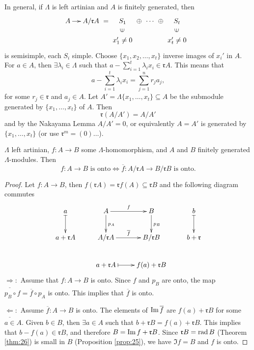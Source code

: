 In general, if $\Lambda$ is left artinian and $A$ is finitely
generated, then 
\[\xymatrix@C-2pc@R-1pc{
A\ar[rrr] &&& A/\mathfrak{r}A &=& S_1 & \oplus &\cdots& \oplus & S_t\\
        &&&                 & & x_1' \neq 0 \ar@{}[u]|-*[@]{\in} &&&& x_t' \neq 0 \ar@{}[u]|-*[@]{\in} &
      }\]
is semisimple, each $S_i$ simple.
Choose $\{ x_1, x_2, \ldots, x_t \}$ inverse images of $x_i'$ in $A$.
For $a \in A$, then $\exists \lambda_i \in \Lambda$ such that $a -
\sum_{i=1}^t \lambda_i x_i \in \mathfrak{r}A$. This means that 
$$a - \sum_{i=1}^t \lambda_i x_i = \sum_{j=1}^n r_ja_j, $$
for some $r_j \in \mathfrak{r}$ and $a_j \in A$. 
Let $A' = \Lambda\{ x_1, \ldots , x_t \} \subseteq A$ be the submodule
generated by $\{ x_1, \ldots , x_t \}$ of $A$. Then 
$$\mathfrak{r}(A/A') = A/A'$$
and by the Nakayama Lemma $A/A' = 0$, or equivalently $A = A'$ is
generated by $\{ x_1, \ldots , x_t \}$ (or use $\mathfrak{r}^m = (0)
\ldots$). 

\begin{lem}\label{lem:f_onto_iff_f-bar_onto}
$\Lambda$ left artinian, $f\colon A \to B$ some $\Lambda$-homomorphism, and
$A$ and $B$ finitely generated $\Lambda$-modules. Then
$$ f\colon A \to B \text{ is onto} \iff \overline{f}\colon A/\mathfrak{r}A \to B/\mathfrak{r}B \text{ is onto.} $$
\end{lem}
\begin{proof}
Let $f\colon A \to B$, then $f(\mathfrak{r}A) = \mathfrak{r}f(A) \subseteq
\mathfrak{r}B$ and the following diagram commutes
$$\xymatrix{
a\ar@{|->}[d] & A\ar[r]^f\ar[d]^{p_A} & B\ar[d]^{p_B} & b\ar@{|->}[d]\\
a + \mathfrak{r}A & A/\mathfrak{r}A\ar[r]^{\overline{f}} & B/\mathfrak{r}B & b + \mathfrak{r}\\
& a + \mathfrak{r}A\ar@{|->}[r] & f(a) + \mathfrak{r}B
}
$$
$\underline{\Rightarrow} :$ Assume that $f\colon A \to B$ is onto. Since
$f$ and $p_B$ are onto, the map $p_B \circ f = \overline{f} \circ p_A$
is onto. This implies that $\overline{f}$ is onto.

$\underline{\Leftarrow} :$ Assume $\overline{f}\colon A \to B$ is onto. The
elements of $\operatorname{Im}\nolimits \overline{f}$ are $f(a) + \mathfrak{r}B$ for some
$a\in A$. Given $b \in B$, then $\exists a \in A$ such that
$b + \mathfrak{r}B = f(a) + \mathfrak{r}B$. This implies that
$b - f(a) \in \mathfrak{r}B$, and therefore
$B = \operatorname{Im}\nolimits f + \mathfrak{r}B$. Since $\mathfrak{r}B = \operatorname{rad}\nolimits B$
(Theorem \ref{thm:26}) is small in $B$ (Proposition \ref{prop:25}), we
have $\Im f = B$ and $f$ is onto.
\end{proof} 

